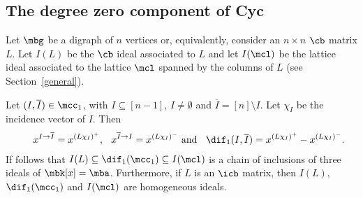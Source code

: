 \subsection{The degree zero component of Cyc}

 Let $\mbg$ be a digraph of $n$ vertices or, equivalently,
consider an $n\times n$ $\cb$ matrix $L$. Let $I(L)$ be the $\cb$
ideal associated to $L$ and let $I(\mcl)$ be the lattice ideal
associated to the lattice $\mcl$ spanned by the columns of $L$ (see
Section~\ref{general}).

\begin{remark}\label{Iind1C}
Let $(I,\overline{I})\in \mcc_1$, with $I\subseteq [n-1]$,
$I\neq\emptyset$ and $\overline{I}=[n]\setminus I$. Let $\chi_I$ be
the incidence vector of $I$. Then
\begin{eqnarray}\label{d1(I,J)}
\phantom{++} x^{I\to\overline{I}}=x^{(L\chi_I)^+}\mbox{, }\;\; x^{\overline{I}\to
  I}=x^{(L\chi_I)^-}\mbox{ and }\;\;\dif_1(I,\overline{I})=
x^{(L\chi_I)^+}-x^{(L\chi_I)^-}.
\end{eqnarray}
If follows that $I(L)\subseteq \dif_1(\mcc_1)\subseteq I(\mcl)$ is a
chain of inclusions of three ideals of $\mbk[x]=\mba$. Furthermore, if
$L$ is an $\icb$ matrix, then $I(L)$, $\dif_1(\mcc_1)$ and $I(\mcl)$ are
homogeneous ideals.
\end{remark}
